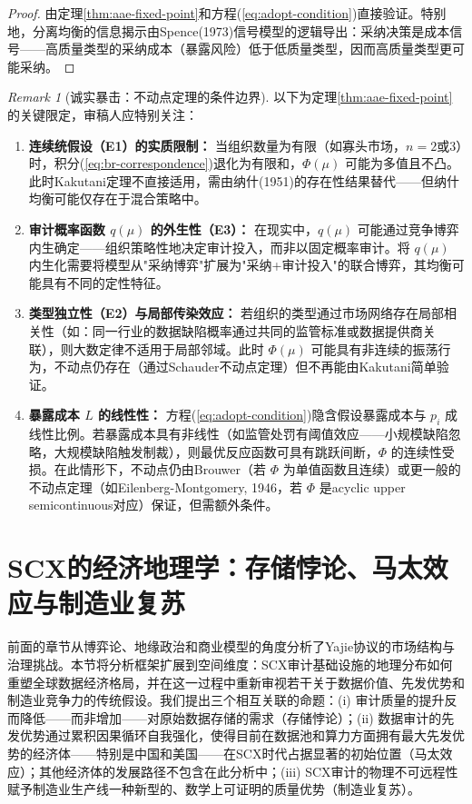 \documentclass[12pt,a4paper]{ctexart}
\theoremstyle{definition}
\theoremstyle{remark}
\newtheorem{remark}{Remark}[section]
\begin{document}
\begin{proof}
由定理\ref{thm:aae-fixed-point}和方程(\ref{eq:adopt-condition})直接验证。特别地，分离均衡的信息揭示由Spence(1973)信号模型的逻辑导出：采纳决策是成本信号——高质量类型的采纳成本（暴露风险）低于低质量类型，因而高质量类型更可能采纳。
\end{proof}

\begin{remark}[诚实暴击：不动点定理的条件边界]
以下为定理\ref{thm:aae-fixed-point}的关键限定，审稿人应特别关注：
\begin{enumerate}[label=(\arabic*), leftmargin=*]
\item \textbf{连续统假设（E1）的实质限制：} 当组织数量为有限（如寡头市场，$n = 2$或$3$）时，积分(\ref{eq:br-correspondence})退化为有限和，$\Phi(\mu)$ 可能为多值且不凸。此时Kakutani定理不直接适用，需由纳什(1951)的存在性结果替代——但纳什均衡可能仅存在于混合策略中。
\item \textbf{审计概率函数 $q(\mu)$ 的外生性（E3）：} 在现实中，$q(\mu)$ 可能通过竞争博弈内生确定——组织策略性地决定审计投入，而非以固定概率审计。将 $q(\mu)$ 内生化需要将模型从"采纳博弈"扩展为"采纳+审计投入"的联合博弈，其均衡可能具有不同的定性特征。
\item \textbf{类型独立性（E2）与局部传染效应：} 若组织的类型通过市场网络存在局部相关性（如：同一行业的数据缺陷概率通过共同的监管标准或数据提供商关联），则大数定律不适用于局部邻域。此时 $\Phi(\mu)$ 可能具有非连续的振荡行为，不动点仍存在（通过Schauder不动点定理）但不再能由Kakutani简单验证。
\item \textbf{暴露成本 $L$ 的线性性：} 方程(\ref{eq:adopt-condition})隐含假设暴露成本与 $p_i$ 成线性比例。若暴露成本具有非线性（如监管处罚有阈值效应——小规模缺陷忽略，大规模缺陷触发制裁），则最优反应函数可具有跳跃间断，$\Phi$ 的连续性受损。在此情形下，不动点仍由Brouwer（若 $\Phi$ 为单值函数且连续）或更一般的不动点定理（如Eilenberg-Montgomery, 1946，若 $\Phi$ 是acyclic upper semicontinuous对应）保证，但需额外条件。
\end{enumerate}
\end{remark}

\section{SCX的经济地理学：存储悖论、马太效应与制造业复苏}

前面的章节从博弈论、地缘政治和商业模型的角度分析了Yajie协议的市场结构与治理挑战。本节将分析框架扩展到空间维度：SCX审计基础设施的地理分布如何重塑全球数据经济格局，并在这一过程中重新审视若干关于数据价值、先发优势和制造业竞争力的传统假设。我们提出三个相互关联的命题：(i) 审计质量的提升反而降低——而非增加——对原始数据存储的需求（存储悖论）；(ii) 数据审计的先发优势通过累积因果循环自我强化，使得目前在数据池和算力方面拥有最大先发优势的经济体——特别是中国和美国——在SCX时代占据显著的初始位置（马太效应）；其他经济体的发展路径不包含在此分析中；(iii) SCX审计的物理不可远程性赋予制造业生产线一种新型的、数学上可证明的质量优势（制造业复苏）。
\end{document}
